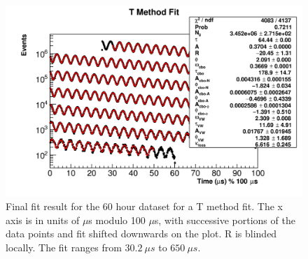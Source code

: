	\begin{figure}[]
		\centering
		\includegraphics[width=\textwidth]{TMethod_moduloPlot}
	    \caption[TMethod_moduloPlot]{Final fit result for the 60 hour dataset for a T method fit. The x axis is in units of $\mu$s modulo 100 $\mu$s, with successive portions of the data points and fit shifted downwards on the plot. R is blinded locally. The fit ranges from $\SI{30.2}{\mu s}$ to $\SI{650}{\mu s}$.}
	    \label{fig:TMethod_moduloPlot}
	\end{figure}

